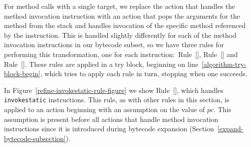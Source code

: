 For method calls with a single target, we replace the action that
handles the method invocation instruction with an action that pops the
arguments for the method from the stack and handles invocation of the
specific method referenced by the instruction.
This is handled slightly differently for each of the method invocation
instructions in our bytecode subset, so we have three rules for
performing this transformation, one for each
instruction:~Rule~[],
Rule~[] and
Rule~[].
These rules are applied in a try block, beginning on
line~\ref{algorithm-try-block-begin}, which tries to apply each rule in
turn, stopping when one succeeds.

In Figure~\ref{refine-invokestatic-rule-figure} we show
Rule~[], which handles
\texttt{invokestatic} instructions.
This rule, as with other rules in this section, is applied to an
action beginning with an assumption on the value of $pc$.
This assumption is present before all actions that handle method
invocation instructions since it is introduced during bytecode
expansion (Section~\ref{expand-bytecode-subsection}).
